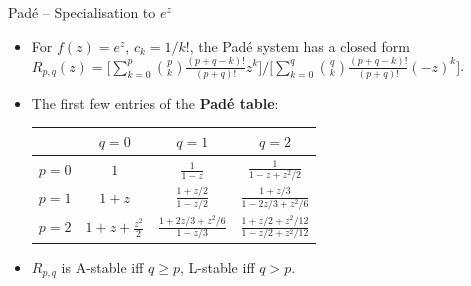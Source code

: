 \documentclass[11pt,aspectratio=169]{beamer}
\begin{document}
\begin{frame}{Padé -- Specialisation to $e^z$}

\begin{itemize}

\item For $f(z) = e^z$, $c_k = 1/k!$, the Padé system has a closed
  form $R_{p,q}(z) = \big[\sum_{k=0}^{p}\binom{p}{k}\tfrac{(p+q-k)!}{(p+q)!}z^k\big] \big/ \big[\sum_{k=0}^{q}\binom{q}{k}\tfrac{(p+q-k)!}{(p+q)!}(-z)^k\big]$.\newline

\item The first few entries of the \textbf{Padé table}:
  \begin{center}
    \scriptsize
    \renewcommand{\arraystretch}{1.4}
    \begin{tabular}{c|ccc}
      \toprule
       & $q=0$ & $q=1$ & $q=2$ \\
      \midrule
      $p=0$ & $1$ & $\tfrac{1}{1-z}$ & $\tfrac{1}{1-z+z^2/2}$ \\
      $p=1$ & $1+z$ & $\tfrac{1+z/2}{1-z/2}$ & $\tfrac{1+z/3}{1-2z/3+z^2/6}$ \\
      $p=2$ & $1+z+\tfrac{z^2}{2}$ & $\tfrac{1+2z/3+z^2/6}{1-z/3}$ &
              $\tfrac{1+z/2+z^2/12}{1-z/2+z^2/12}$ \\
      \bottomrule
    \end{tabular}
  \end{center}

  \medskip
  
\item[$\Rightarrow$] $R_{p,q}$ is A-stable iff $q\ge p$,
  L-stable iff $q>p$.

\end{itemize}

\end{frame}
\end{document}
